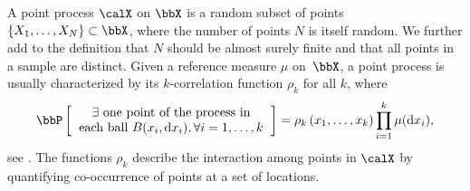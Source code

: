\documentclass[twoside,11pt]{article}
\newcommand*\diff{\mathop{}\!\mathrm{d}}
\newcommand{\lrb}[1]{\left[ #1 \right]}
\newcommand{\lrp}[1]{\left( #1 \right)}
\newcommand{\lrcb}[1]{\left\{ #1 \right\}}
\newcommand\Prob{\operatorname{\bbP}}
\newcommand\Exp{\operatorname{\bbE}}
\newcommand{\Proba}[1]{\Prob\lrb{#1}}
\newcommand{\Expe}[1]{\Exp\lrb{#1}}
\begin{document}
	A point process $\calX$ on $\bbX$ is a random subset of points $\lrcb{X_1, \dots, X_N} \subset \bbX$, where the number of points $N$ is itself random.
	We further add to the definition that $N$ should be almost surely finite and that all points in a sample are distinct.
	Given a reference measure $\mu$ on~$\bbX$, a point process is usually characterized by its $k$-correlation function $\rho_k$ for all $k$, where
	\begin{equation*}
	\label{eq:correlation_function_intuition}
		\Proba{
			\begin{tabular}{c}
				$\exists$ one point of the process in\\
				each ball $B(x_i, \diff x_i), \forall i=1,\dots, k $
			\end{tabular}
		}
		= \rho_k\lrp{x_1,\dots,x_k}
			\prod_{i=1}^k \mu(\diff x_i),
	\end{equation*}
	see \citet[Section 4]{MoWa04}.
	The functions $\rho_k$ describe the interaction among points in $\calX$ by quantifying co-occurrence of points at a set of locations.

\end{document}
